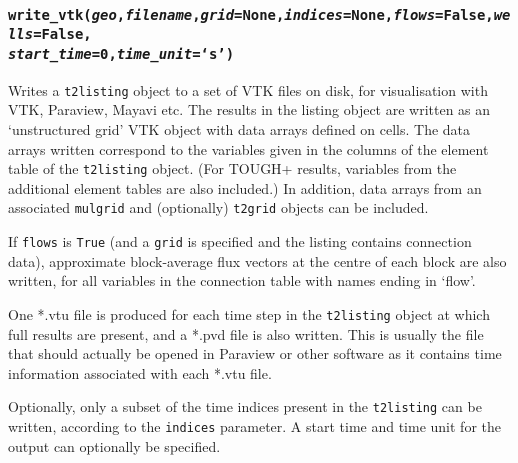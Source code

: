 \subsubsection{\texttt{write\_vtk(\emph{geo},\emph{filename},\emph{grid}=None,\emph{indices}=None,\emph{flows}=False,\emph{wells}=False,\\
\emph{start\_time}=0,\emph{time\_unit}=`s')}}

Writes a \texttt{t2listing} object to a set of VTK files on disk, for visualisation with VTK, Paraview, Mayavi etc.  The results in the listing object are written as an `unstructured grid' VTK object with data arrays defined on cells.  The data arrays written correspond to the variables given in the columns of the element table of the \texttt{t2listing} object.  (For TOUGH+ results, variables from the additional element tables are also included.) In addition, data arrays from an associated \texttt{mulgrid} and (optionally) \texttt{t2grid} objects can be included.

If \texttt{flows} is \texttt{True} (and a \texttt{grid} is specified and the listing contains connection data), approximate block-average flux vectors at the centre of each block are also written, for all variables in the connection table with names ending in `flow'.

One *.vtu file is produced for each time step in the \texttt{t2listing} object at which full results are present, and a *.pvd file is also written.  This is usually the file that should actually be opened in Paraview or other software as it contains time information associated with each *.vtu file.

Optionally, only a subset of the time indices present in the \texttt{t2listing} can be written, according to the \texttt{indices} parameter.  A start time and time unit for the output can optionally be specified.

